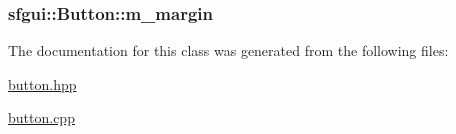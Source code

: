 \hypertarget{classsfgui_1_1Button_20ee48b44f31ad5b5de11dc3b00103a7}{
\subsubsection[m\_\-margin]{ {\bf sfgui::Button::m\_\-margin}}}
\label{classsfgui_1_1Button_20ee48b44f31ad5b5de11dc3b00103a7}




The documentation for this class was generated from the following files:\begin{CompactItemize}
\item 
\hyperlink{button_8hpp}{button.hpp}\item 
\hyperlink{button_8cpp}{button.cpp}\end{CompactItemize}
